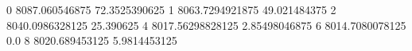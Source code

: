0 8087.060546875 72.3525390625
1 8063.7294921875 49.021484375
2 8040.0986328125 25.390625
4 8017.56298828125 2.85498046875
6 8014.7080078125 0.0
8 8020.689453125 5.9814453125
